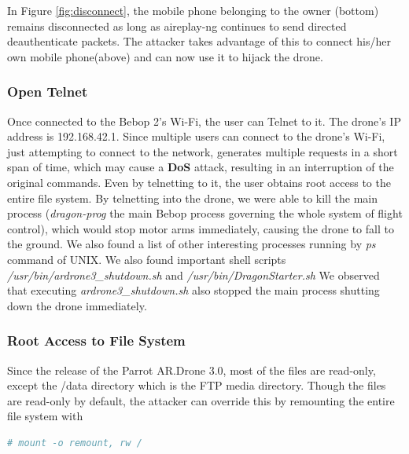 \documentclass[conference]{IEEEtran}
\begin{document}
In Figure \ref{fig:disconnect}, the mobile phone belonging to the owner (bottom) remains disconnected as long as aireplay-ng continues to send directed deauthenticate packets.
The attacker takes advantage of this to connect his/her own mobile phone(above) and can now use it to hijack the drone.  

\subsubsection{Open Telnet}
Once connected to the Bebop 2's Wi-Fi, the user can Telnet to it. The drone's IP address is 192.168.42.1. Since multiple users can connect to the drone's Wi-Fi, just attempting to connect to the network, generates multiple requests in a short span of time, which may cause a \textbf{DoS} attack, resulting in an interruption of the original commands.
Even by telnetting to it, the user obtains root access to the entire file system. 
By telnetting into the drone, we were able to kill the main process (\textit{dragon-prog} the main Bebop process governing the whole system of flight control), which would stop motor arms immediately, causing the drone to fall to the ground.
We also found a list of other interesting processes running by \emph{ps} command of UNIX. We also found important shell scripts \emph{/usr/bin/ardrone3\_shutdown.sh} and \emph{/usr/bin/DragonStarter.sh}
We observed that executing \emph{ardrone3\_shutdown.sh} also stopped the main process shutting down the 
drone immediately. 

\subsubsection{Root Access to File System}
Since the release of the Parrot AR.Drone 3.0, most of the files are read-only, except the /data directory which is the FTP media directory.
Though the files are read-only by default, the attacker can override this by remounting the entire file system with
\begin{lstlisting}[language =  bash]
# mount -o remount, rw /
\end{lstlisting}

\end{document}
